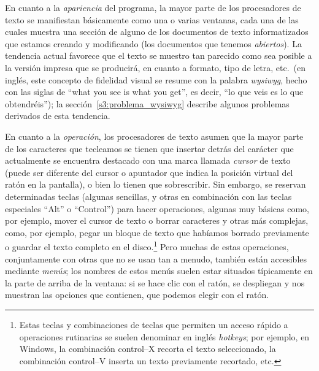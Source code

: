 En cuanto a la \emph{apariencia} del programa, la mayor parte de los procesadores de texto se manifiestan básicamente como una o varias ventanas, cada una de las cuales muestra una sección de alguno de los documentos de texto informatizados que estamos creando y modificando (los documentos que tenemos \emph{abiertos}). La tendencia actual favorece que el texto se muestro tan parecido como sea posible a la versión impresa que se  producirá, en cuanto a formato, tipo de letra, etc.\ (en inglés, este concepto de fidelidad visual se resume con la palabra {\em wysiwyg}, hecho con las siglas de ``what you see is what you get'', es decir, ``lo que veis es lo que obtendréis''); la sección~\ref{s3:problema_wysiwyg} describe algunos problemas derivados de esta tendencia. 

En cuanto a la \emph{operación}, los procesadores de texto asumen que la mayor parte de los caracteres que tecleamos se tienen que insertar detrás del carácter que actualmente se encuentra destacado con una marca llamada {\em cursor} de texto (puede ser diferente del cursor o apuntador que indica la posición virtual del ratón en la pantalla), o bien lo tienen que sobrescribir. Sin embargo, se reservan determinadas teclas (algunas sencillas, y otras en combinación con las teclas especiales ``Alt'' o ``Control'') para hacer operaciones, algunas muy básicas como, por ejemplo, mover el cursor de texto o borrar caracteres y otras más complejas, como, por ejemplo, pegar un bloque de texto que habíamos borrado previamente o guardar el texto completo en el disco.\footnote{Estas teclas y combinaciones de teclas que permiten un acceso rápido a operaciones rutinarias se suelen denominar en inglés \emph{hotkeys}; por ejemplo, en Windows, la combinación control--X recorta el texto seleccionado, la combinación control--V inserta un texto previamente recortado, etc.} Pero muchas de estas operaciones, conjuntamente con otras que no se usan tan a menudo, también están accesibles mediante \emph{menús}; los nombres de estos menús suelen estar situados típicamente en la parte de arriba de la ventana: si se  hace clic con el ratón, se despliegan y nos muestran las opciones que contienen, que podemos elegir con el ratón. 

